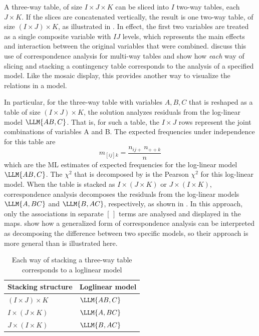 \documentclass[11pt]{book}\usepackage[]{graphicx}\usepackage[]{color}
\begin{document}
A
three-way table, of size \(I \times  J \times  K\) can be sliced into
\(I\) two-way tables, each \(J \times  K\).  If the slices are
concatenated vertically, the result is one two-way table, of size \((
I \times  J ) \times  K\), as illustrated in .
In effect, the first two variables are
treated as a single composite variable with \(IJ\) levels, which represents the main
effects and interaction between the original variables that were
combined.
discuss this use of
correspondence analysis for multi-way tables and show how \emph{each} way of
slicing and stacking a contingency table corresponds to the analysis
of a specified \loglin model.
Like the mosaic display, this provides another way to visualize the relations
in a \loglin model.

In particular, for the three-way table with variables $A, B, C$
that is reshaped as a table of
size \(( I \times  J ) \times  K\), the \ca
solution analyzes residuals from the log-linear model 
$\LLM{AB,C}$.
That
is, for such a table, the \(I \times  J\) rows represent the joint
combinations of variables A and B.  The expected frequencies under
independence for this table are
\begin{equation}\label{eq:mij-k}
  m_{[ij]k} 
  = \frac{ n_{ij+} \,  n_{++k} }{n}
\end{equation}
which are the ML estimates of expected frequencies for the log-linear
model $\LLM{AB, C}$.  
The \(\chi^2\) that is decomposed by \ca is the Pearson
\(\chi^2\) for this log-linear model.  When the table is stacked as
\(I \times  ( J \times  K )\) or \(J \times  ( I \times  K )\),
correspondence analysis decomposes the residuals from the log-linear
models $\LLM{A,BC}$ and $\LLM{B,AC}$, respectively, as shown in 
.
In this approach, only the associations in separate $[ \, ]$ terms are analysed
and displayed in the \ca maps.
show how a generalized form of correspondence analysis
can be interpreted as decomposing the difference between two specific
\loglin models, so their approach is more general than is illustrated
here.

\begin{table}[htb]
  \centering
  \caption{Each way of stacking a three-way table corresponds to a loglinear model}\label{tab:stacking}
  \vspace{1ex}
  \begin{tabular}{ll}
   \hline
   Stacking structure & Loglinear model \\ [.5ex]
   \hline
   \(( I \times  J ) \times  K\) & $\LLM{AB,C}$ \\
   \(I \times  ( J \times  K )\) & $\LLM{A,BC}$ \\
   \(J \times  ( I \times  K )\) & $\LLM{B,AC}$ \\
   \hline
  \end{tabular}
\end{table}
\end{document}
